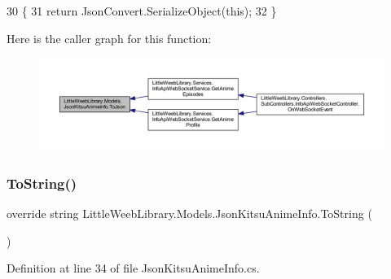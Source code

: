 \begin{DoxyCode}
30         \{
31             \textcolor{keywordflow}{return} JsonConvert.SerializeObject(\textcolor{keyword}{this});
32         \}
\end{DoxyCode}
Here is the caller graph for this function\+:\nopagebreak
\begin{figure}[H]
\begin{center}
\leavevmode
\includegraphics[width=350pt]{class_little_weeb_library_1_1_models_1_1_json_kitsu_anime_info_a6f026c01a93f73b903cfef82d4c2dad5_icgraph}
\end{center}
\end{figure}
\mbox{\label{class_little_weeb_library_1_1_models_1_1_json_kitsu_anime_info_a869f64c42523b48911549a2f3fffffa7}} 
\subsubsection{\texorpdfstring{To\+String()}{ToString()}}
{\footnotesize\ttfamily override string Little\+Weeb\+Library.\+Models.\+Json\+Kitsu\+Anime\+Info.\+To\+String (\begin{DoxyParamCaption}{ }\end{DoxyParamCaption})}



Definition at line 34 of file Json\+Kitsu\+Anime\+Info.\+cs.


